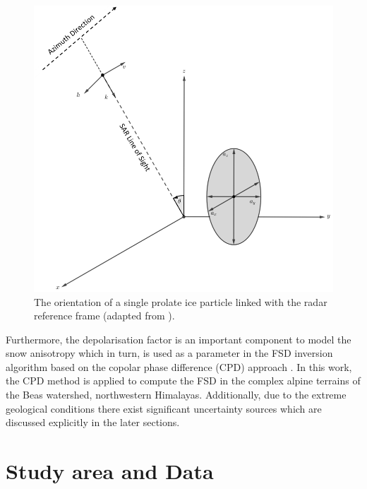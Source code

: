 \documentclass{article}
\begin{document}
\begin{figure}[htb]
\centering
\includegraphics[scale=0.2]{Prolate_New.png}
\caption{The orientation of a single prolate ice particle linked with the radar reference frame (adapted from \cite{Leinss2014}).}
\label{fig:prolate}
\end{figure}

Furthermore, the depolarisation factor is an important component to model the snow anisotropy which in turn, is used as a parameter in the FSD inversion algorithm based on the copolar phase difference (CPD) approach \cite{Leinss2014}. In this work, the CPD method is applied to compute the FSD in the complex alpine terrains of the Beas watershed, northwestern Himalayas. Additionally, due to the extreme geological conditions there exist significant uncertainty sources which are discussed explicitly in the later sections.

\section{Study area and Data}
\label{sec:study}
\end{document}
